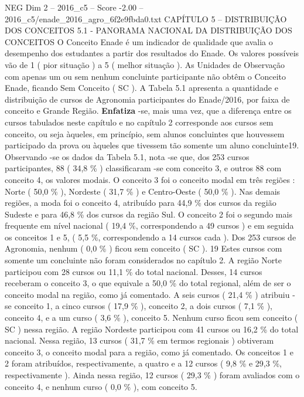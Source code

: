 \begin{textsample}{NEG Dim 2 – 2016\_c5 – Score -2.00 – 2016\_c5/enade\_2016\_agro\_6f2e9fbda0.txt}  \label{ex:f2_neg_040}
CAPÍTULO 5 – DISTRIBUIÇÃO DOS CONCEITOS 5.1 - PANORAMA NACIONAL DA DISTRIBUIÇÃO DOS CONCEITOS O Conceito Enade é um indicador de qualidade que avalia o desempenho dos estudantes a partir dos resultados do Enade.
Os valores possíveis vão de 1 ( pior situação ) a 5 ( melhor situação ).
As Unidades de Observação com apenas um ou sem nenhum concluinte participante não obtêm o Conceito Enade, ficando Sem Conceito ( SC ).
A Tabela 5.1 apresenta a quantidade e distribuição de cursos de Agronomia participantes do Enade/2016, por faixa de conceito e Grande Região. \textbf{Enfatiza} -se, mais uma vez, que a diferença entre os cursos tabulados neste capítulo e no capítulo 2 corresponde aos cursos sem conceito, ou seja àqueles, em princípio, sem alunos concluintes que houvessem participado da prova ou àqueles que tivessem tão somente um aluno concluinte19.
Observando -se os dados da Tabela 5.1, nota -se que, dos 253 cursos participantes, 88 ( 34,8 \% ) classificaram -se com conceito 3, e outros 88 com conceito 4, os valores modais.
O conceito 3 foi o conceito modal em três regiões : Norte ( 50,0 \% ), Nordeste ( 31,7 \% ) e Centro-Oeste ( 50,0 \% ).
Nas demais regiões, a moda foi o conceito 4, atribuído para 44,9 \% dos cursos da região Sudeste e para 46,8 \% dos cursos da região Sul.
O conceito 2 foi o segundo mais frequente em nível nacional ( 19,4 \%, correspondendo a 49 cursos ) e em seguida os conceitos 1 e 5, ( 5,5 \%, correspondendo a 14 cursos cada ).
Dos 253 cursos de Agronomia, nenhum ( 0,0 \% ) ficou sem conceito ( SC ). 19 Estes cursos com somente um concluinte não foram considerados no capítulo 2.
A região Norte participou com 28 cursos ou 11,1 \% do total nacional.
Desses, 14 cursos receberam o conceito 3, o que equivale a 50,0 \% do total regional, além de ser o conceito modal na região, como já comentado.
A seis cursos ( 21,4 \% ) atribuiu -se conceito 1, a cinco cursos ( 17,9 \% ), conceito 2, a dois cursos ( 7,1 \% ), conceito 4, e a um curso ( 3,6 \% ), conceito 5.
Nenhum curso ficou sem conceito ( SC ) nessa região.
A região Nordeste participou com 41 cursos ou 16,2 \% do total nacional.
Nessa região, 13 cursos ( 31,7 \% em termos regionais ) obtiveram conceito 3, o conceito modal para a região, como já comentado.
Os conceitos 1 e 2 foram atribuídos, respectivamente, a quatro e a 12 cursos ( 9,8 \% e 29,3 \%, respectivamente ).
Ainda nessa região, 12 cursos ( 29,3 \% ) foram avaliados com o conceito 4, e nenhum curso ( 0,0 \% ), com conceito 5.

\end{textsample}
